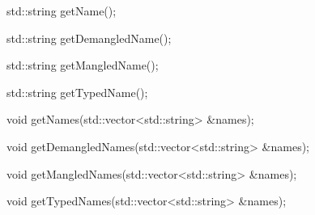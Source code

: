 


{

std::string getName();}



{

std::string getDemangledName();}



{

std::string getMangledName();}



{

std::string getTypedName();}



{

void getNames(std::vector<std::string> &names);}



{

void getDemangledNames(std::vector<std::string> &names);}



{

void getMangledNames(std::vector<std::string> &names);}



{

void getTypedNames(std::vector<std::string> &names);}



